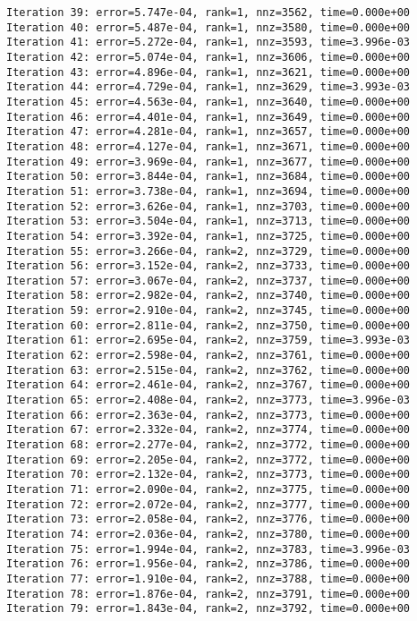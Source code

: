 \documentclass[11pt]{article}
\begin{document}
\begin{Verbatim}[commandchars=\\\{\}]
Iteration 39: error=5.747e-04, rank=1, nnz=3562, time=0.000e+00
Iteration 40: error=5.487e-04, rank=1, nnz=3580, time=0.000e+00
Iteration 41: error=5.272e-04, rank=1, nnz=3593, time=3.996e-03
Iteration 42: error=5.074e-04, rank=1, nnz=3606, time=0.000e+00
Iteration 43: error=4.896e-04, rank=1, nnz=3621, time=0.000e+00
Iteration 44: error=4.729e-04, rank=1, nnz=3629, time=3.993e-03
Iteration 45: error=4.563e-04, rank=1, nnz=3640, time=0.000e+00
Iteration 46: error=4.401e-04, rank=1, nnz=3649, time=0.000e+00
Iteration 47: error=4.281e-04, rank=1, nnz=3657, time=0.000e+00
Iteration 48: error=4.127e-04, rank=1, nnz=3671, time=0.000e+00
Iteration 49: error=3.969e-04, rank=1, nnz=3677, time=0.000e+00
Iteration 50: error=3.844e-04, rank=1, nnz=3684, time=0.000e+00
Iteration 51: error=3.738e-04, rank=1, nnz=3694, time=0.000e+00
Iteration 52: error=3.626e-04, rank=1, nnz=3703, time=0.000e+00
Iteration 53: error=3.504e-04, rank=1, nnz=3713, time=0.000e+00
Iteration 54: error=3.392e-04, rank=1, nnz=3725, time=0.000e+00
Iteration 55: error=3.266e-04, rank=2, nnz=3729, time=0.000e+00
Iteration 56: error=3.152e-04, rank=2, nnz=3733, time=0.000e+00
Iteration 57: error=3.067e-04, rank=2, nnz=3737, time=0.000e+00
Iteration 58: error=2.982e-04, rank=2, nnz=3740, time=0.000e+00
Iteration 59: error=2.910e-04, rank=2, nnz=3745, time=0.000e+00
Iteration 60: error=2.811e-04, rank=2, nnz=3750, time=0.000e+00
Iteration 61: error=2.695e-04, rank=2, nnz=3759, time=3.993e-03
Iteration 62: error=2.598e-04, rank=2, nnz=3761, time=0.000e+00
Iteration 63: error=2.515e-04, rank=2, nnz=3762, time=0.000e+00
Iteration 64: error=2.461e-04, rank=2, nnz=3767, time=0.000e+00
Iteration 65: error=2.408e-04, rank=2, nnz=3773, time=3.996e-03
Iteration 66: error=2.363e-04, rank=2, nnz=3773, time=0.000e+00
Iteration 67: error=2.332e-04, rank=2, nnz=3774, time=0.000e+00
Iteration 68: error=2.277e-04, rank=2, nnz=3772, time=0.000e+00
Iteration 69: error=2.205e-04, rank=2, nnz=3772, time=0.000e+00
Iteration 70: error=2.132e-04, rank=2, nnz=3773, time=0.000e+00
Iteration 71: error=2.090e-04, rank=2, nnz=3775, time=0.000e+00
Iteration 72: error=2.072e-04, rank=2, nnz=3777, time=0.000e+00
Iteration 73: error=2.058e-04, rank=2, nnz=3776, time=0.000e+00
Iteration 74: error=2.036e-04, rank=2, nnz=3780, time=0.000e+00
Iteration 75: error=1.994e-04, rank=2, nnz=3783, time=3.996e-03
Iteration 76: error=1.956e-04, rank=2, nnz=3786, time=0.000e+00
Iteration 77: error=1.910e-04, rank=2, nnz=3788, time=0.000e+00
Iteration 78: error=1.876e-04, rank=2, nnz=3791, time=0.000e+00
Iteration 79: error=1.843e-04, rank=2, nnz=3792, time=0.000e+00

\end{Verbatim}
\end{document}
